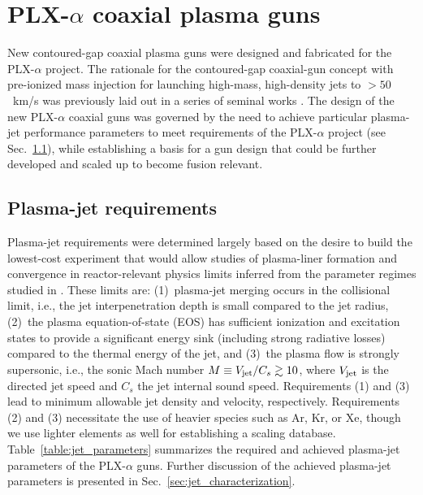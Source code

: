 \documentclass[journal]{IEEEtran}
\begin{document}
\section{PLX-$\alpha$ coaxial plasma guns}
\label{sec:guns}

New contoured-gap coaxial plasma guns
were designed and fabricated for the PLX-$\alpha$ project.  The rationale for
the contoured-gap coaxial-gun concept with pre-ionized mass injection
for launching high-mass, high-density jets to $>50$~km/s
was previously laid out in a series of seminal works \cite{thio02,cassibry06,witherspoon09}.
The design of the new PLX-$\alpha$ coaxial guns was governed by the need to achieve
particular
plasma-jet performance parameters to meet requirements of the PLX-$\alpha$ project (see
Sec.~\ref{sec:jet_requirements}), while establishing a basis for
a gun design that could be further developed and scaled up to become fusion relevant.

\subsection{Plasma-jet requirements}
\label{sec:jet_requirements}

Plasma-jet requirements were determined largely based on the desire to
build the lowest-cost experiment
that would allow studies of plasma-liner formation and convergence in reactor-relevant physics limits
inferred from the parameter regimes studied in \cite{knapp14}.  These limits are:
(1)~plasma-jet merging occurs in the collisional limit, i.e.,
the jet interpenetration depth is small compared to the jet radius, (2)~the plasma equation-of-state
(EOS)
has sufficient ionization and excitation states to provide a significant energy sink
(including strong radiative losses) compared to the
thermal energy of the jet, and (3)~the plasma flow is strongly supersonic, i.e., the sonic Mach number
$M\equiv V_{\rm jet}/C_s \gtrsim 10$, where $V_{\rm jet}$ is the directed jet speed
and $C_s$ the jet internal sound speed.
Requirements (1) and (3) lead to minimum allowable jet density and velocity, respectively.  Requirements (2) and (3) necessitate the use of heavier species such
as Ar, Kr, or Xe, though we use lighter elements as well for establishing a scaling database.
Table~\ref{table:jet_parameters} summarizes the required and
achieved plasma-jet parameters of the PLX-$\alpha$ guns.  Further discussion of the
achieved plasma-jet parameters is presented in Sec.~\ref{sec:jet_characterization}.
\end{document}
